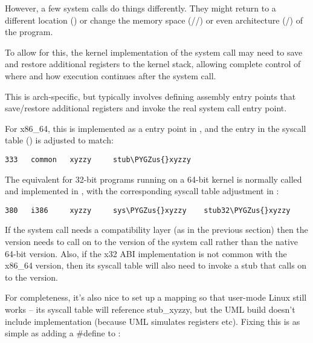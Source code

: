 \documentclass[a4paper,8pt,english]{sphinxmanual}
\def\PYGZus{\char`\_}
\begin{document}
However, a few system calls do things differently.  They might return to a
different location () or change the memory space
(//) or even architecture (/)
of the program.

To allow for this, the kernel implementation of the system call may need to
save and restore additional registers to the kernel stack, allowing complete
control of where and how execution continues after the system call.

This is arch-specific, but typically involves defining assembly entry points
that save/restore additional registers and invoke the real system call entry
point.

For x86\_64, this is implemented as a  entry point in
, and the entry in the syscall table
() is adjusted to match:

\begin{Verbatim}[commandchars=\\\{\}]
333   common   xyzzy     stub\PYGZus{}xyzzy
\end{Verbatim}

The equivalent for 32-bit programs running on a 64-bit kernel is normally
called  and implemented in ,
with the corresponding syscall table adjustment in
:

\begin{Verbatim}[commandchars=\\\{\}]
380   i386     xyzzy     sys\PYGZus{}xyzzy    stub32\PYGZus{}xyzzy
\end{Verbatim}

If the system call needs a compatibility layer (as in the previous section)
then the  version needs to call on to the  version
of the system call rather than the native 64-bit version.  Also, if the x32 ABI
implementation is not common with the x86\_64 version, then its syscall
table will also need to invoke a stub that calls on to the 
version.

For completeness, it's also nice to set up a mapping so that user-mode Linux
still works -- its syscall table will reference stub\_xyzzy, but the UML build
doesn't include  implementation (because UML
simulates registers etc).  Fixing this is as simple as adding a \#define to
:
\end{document}
